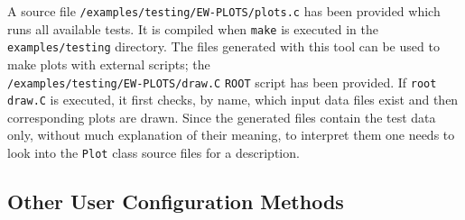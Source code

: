 \documentclass[]{Tauola_interface_design}
\begin{document}
A source file {\tt /examples/testing/EW-PLOTS/plots.c} has been provided which runs all available tests.
It is compiled when {\tt make} is executed in the {\tt examples/testing} directory.
The files generated with this tool can  be used  to make plots with external scripts; the \\
{\tt /examples/testing/EW-PLOTS/draw.C} {\tt ROOT} script has been provided. If  {\tt root draw.C}
is executed, %
it first checks, by name,  which input data files exist and then corresponding plots are drawn. 
Since the generated files contain the test data only,  without much explanation 
of their meaning, 
to interpret them one needs to look into  the {\tt Plot} class source files for a description. 

\subsection{Other User Configuration Methods}
\label{subsection:tauola:other_methods}
\end{document}
